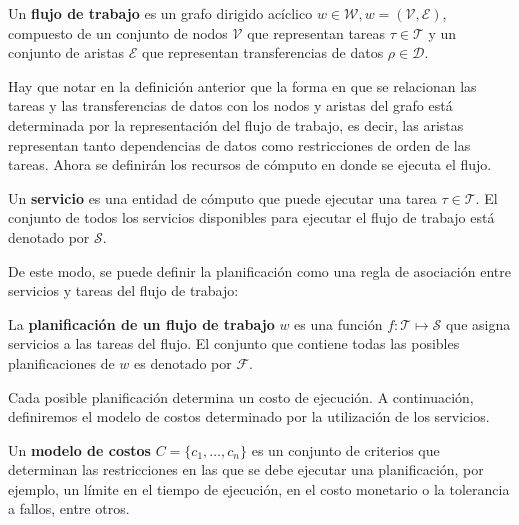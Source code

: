\begin{defn}
Un \textbf{flujo de trabajo} es un grafo dirigido acíclico $w \in \mathcal{W}, w = (\mathcal{V},\mathcal{E})$, compuesto de un conjunto de nodos $\mathcal{V}$ que representan tareas $ \tau \in \mathcal{T}$ y un conjunto de aristas $\mathcal{E}$ que representan transferencias de datos $ \rho \in \mathcal{D}$.
\end{defn}

\noindent Hay que notar en la definición anterior que la forma en que se relacionan las tareas y las transferencias de datos con los nodos y aristas del grafo está determinada por la representación del flujo de trabajo, es decir, las aristas representan tanto dependencias de datos como restricciones de orden de las tareas. Ahora se definirán los recursos de cómputo en donde se ejecuta el flujo.

\begin{defn}
Un \textbf{servicio} es una entidad de cómputo que puede ejecutar una tarea $\tau \in \mathcal{T}$. El conjunto de todos los servicios disponibles para ejecutar el flujo de trabajo está denotado por $\mathcal{S}$.
\end{defn}

\noindent De este modo, se puede definir la planificación como una regla de asociación entre servicios y tareas del flujo de trabajo:

\begin{defn}
La \textbf{planificación de un flujo de trabajo} $w$ es una función $ f: \mathcal{T} \mapsto \mathcal{S}$ que asigna servicios a las tareas del flujo. El conjunto que contiene todas las posibles planificaciones de $w$ es denotado por $\mathcal{F}$.
\end{defn}

\noindent Cada posible planificación determina un costo de ejecución. A continuación, definiremos el modelo de costos determinado por la utilización de los servicios.

\begin{defn}
Un \textbf{modelo de costos} $C = \{c_1, \dots, c_n\}$ es un conjunto de criterios que determinan las restricciones en las que se debe ejecutar una planificación, por ejemplo, un límite en el tiempo de ejecución, en el costo monetario o la tolerancia a fallos, entre otros.
\end{defn}

